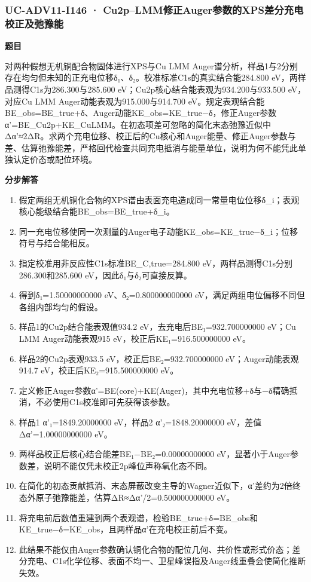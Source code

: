 \documentclass[UTF8,11pt,a4paper]{ctexart}
\begin{document}
\subsubsection*{UC-ADV11-I146 · Cu2p–LMM修正Auger参数的XPS差分充电校正及弛豫能}
\noindent\textbf{题目}\par
对两种假想无机铜配合物固体进行XPS与Cu LMM Auger谱分析，样品1与2分别存在均匀但未知的正充电位移δ₁、δ₂。校准标准C1s的真实结合能284.800 eV，两样品测得C1s为286.300与285.600 eV；Cu2p核心结合能表观为934.200与933.500 eV，对应Cu LMM Auger动能表观为915.000与914.700 eV。规定表观结合能BE\_obs=BE\_true+δ、Auger动能KE\_obs=KE\_true−δ，修正Auger参数α'=BE\_Cu2p+KE\_CuLMM。在初态项差可忽略的简化末态弛豫近似中Δα'≈2ΔR。求两个充电位移、校正后的Cu核心和Auger能量、修正Auger参数与差、估算弛豫能差，严格回代检查共同充电抵消与能量单位，说明为何不能凭此单独认定价态或配位环境。\par
\medskip\noindent\textbf{分步解答}
\begin{enumerate}
\item 假定两组无机铜化合物的XPS谱由表面充电造成同一常量电位位移δ\_i；表观核心能级结合能BE\_obs=BE\_true+δ\_i。
\item 同一充电位移使同一次测量的Auger电子动能KE\_obs=KE\_true−δ\_i；位移符号与结合能相反。
\item 指定校准用非反应性C1s标准BE\_C,true=284.800 eV，两样品测得C1s分别286.300和285.600 eV，因此δ₁与δ₂可直接反算。
\item 得到δ₁=1.50000000000 eV、δ₂=0.800000000000 eV，满足两组电位偏移不同但各组内部均匀的假设。
\item 样品1的Cu2p结合能表观值934.2 eV，去充电后BE₁=932.700000000 eV；Cu LMM Auger动能表观915 eV，校正后KE₁=916.500000000 eV。
\item 样品2的Cu2p表观933.5 eV，校正后BE₂=932.700000000 eV；Auger动能表观914.7 eV，校正后KE₂=915.500000000 eV。
\item 定义修正Auger参数α'=BE(core)+KE(Auger)，其中充电位移+δ与−δ精确抵消，不必使用C1s校准即可先获得该参数。
\item 样品1 α'₁=1849.20000000 eV，样品2 α'₂=1848.20000000 eV，差值Δα'=1.00000000000 eV。
\item 两样品校正后核心结合能差BE₁−BE₂=0.00000000000 eV，显著小于Auger参数差，说明不能仅凭未校正2p峰位声称氧化态不同。
\item 在简化的初态贡献抵消、末态屏蔽改变主导的Wagner近似下，α'差约为2倍终态外原子弛豫能差，估算ΔR≈Δα'/2=0.500000000000 eV。
\item 将充电前后数值重建到两个表观谱，检验BE\_true+δ=BE\_obs和KE\_true−δ=KE\_obs，且两样品α'在充电校正前后不变。
\item 此结果不能仅由Auger参数确认铜化合物的配位几何、共价性或形式价态；差分充电、C1s化学位移、表面不均一、卫星峰误指及Auger线重叠会使简化推断失效。
\end{enumerate}
\end{document}
